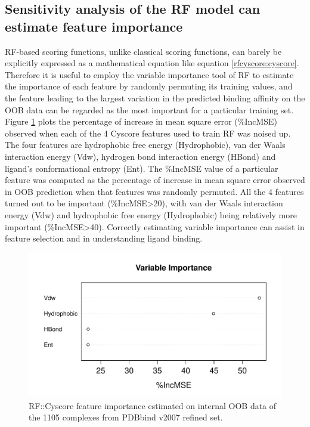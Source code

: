 \subsection{Sensitivity analysis of the RF model can estimate feature importance}

RF-based scoring functions, unlike classical scoring functions, can barely be explicitly expressed as a mathematical equation like equation \eqref{rfcyscore:cyscore}. Therefore it is useful to employ the variable importance tool of RF to estimate the importance of each feature by randomly permuting its training values, and the feature leading to the largest variation in the predicted binding affinity on the OOB data can be regarded as the most important for a particular training set. Figure \ref{rfcyscore:varimp} plots the percentage of increase in mean square error (\%IncMSE) observed when each of the 4 Cyscore features used to train RF was noised up. The four features are hydrophobic free energy (Hydrophobic), van der Waals interaction energy (Vdw), hydrogen bond interaction energy (HBond) and ligand's conformational entropy (Ent). The \%IncMSE value of a particular feature was computed as the percentage of increase in mean square error observed in OOB prediction when that features was randomly permuted. All the 4 features turned out to be important (\%IncMSE\textgreater 20), with van der Waals interaction energy (Vdw) and hydrophobic free energy (Hydrophobic) being relatively more important (\%IncMSE\textgreater 40). Correctly estimating variable importance can assist in feature selection and in understanding ligand binding.

\begin{figure}
\includegraphics[width=\linewidth]{../rfcyscore/varimp.pdf}
\caption{RF::Cyscore feature importance estimated on internal OOB data of the 1105 complexes from PDBbind v2007 refined set.}
\label{rfcyscore:varimp}
\end{figure}

